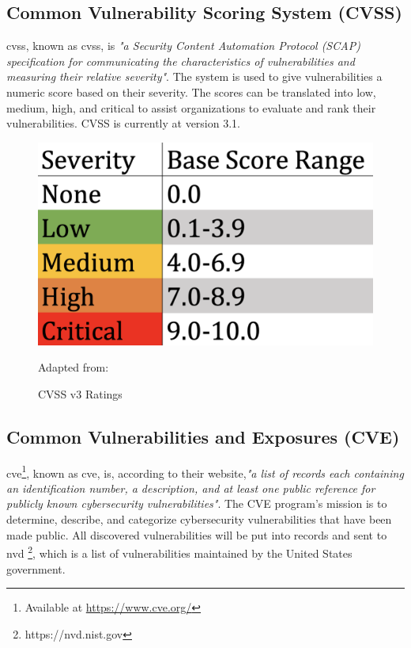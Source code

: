 \subsection{Common Vulnerability Scoring System (CVSS)}
\acrlong{cvss}, known as \acrshort{cvss}, is \textit{"a Security Content Automation Protocol (SCAP) specification for communicating the characteristics of vulnerabilities and measuring their relative severity"}\cite{nistCVSS}. The system is used to give vulnerabilities a numeric score based on their severity. The scores can be translated into low, medium, high, and critical to assist organizations to evaluate and rank their vulnerabilities. CVSS is currently at version 3.1. \cite{CVSS}
\begin{figure}[H]
    \centering
    \includegraphics[scale=0.3]{Images/CVSS.png}
    \caption{CVSS v3 Ratings} Adapted from:\cite{cvssrating}
    \label{fig:CVSS v3 Ratings}
\end{figure}


\subsection{Common Vulnerabilities and Exposures (CVE)}
\label{Common Vulnerabilities and Exposures}
\acrlong{cve}\footnote{Available at \url{https://www.cve.org/}}, known as \acrshort{cve}, is, according to their website,\textit{"a list of records each containing an identification number, a description, and at least one public reference for publicly known cybersecurity vulnerabilities"}\cite{CVE}. The CVE program's mission is to determine, describe, and categorize cybersecurity vulnerabilities that have been made public. All discovered vulnerabilities will be put into records and sent to \acrlong{nvd} \footnote{https://nvd.nist.gov}, which is a list of vulnerabilities maintained by the United States government.

